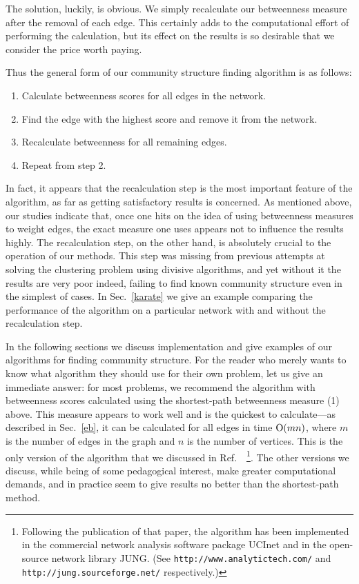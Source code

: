 \documentclass[twocolumn,pre,superscriptaddress]{revtex4}
\begin{document}
The solution, luckily, is obvious.  We simply recalculate our betweenness
measure after the removal of each edge.  This certainly adds to the
computational effort of performing the calculation, but its effect on the
results is so desirable that we consider the price worth paying.

Thus the general form of our community structure finding algorithm is as
follows:
\begin{enumerate}
\item Calculate betweenness scores for all edges in the network.
\item Find the edge with the highest score and remove it from the network.
\item Recalculate betweenness for all remaining edges.
\item Repeat from step 2.
\end{enumerate}

In fact, it appears that the recalculation step is the most important
feature of the algorithm, as far as getting satisfactory results is
concerned.  As mentioned above, our studies indicate that, once one hits on
the idea of using betweenness measures to weight edges, the exact measure
one uses appears not to influence the results highly.  The recalculation
step, on the other hand, is absolutely crucial to the operation of our
methods.  This step was missing from previous attempts at solving the
clustering problem using divisive algorithms, and yet without it the
results are very poor indeed, failing to find known community structure
even in the simplest of cases.  In Sec.~\ref{karate} we give an example
comparing the performance of the algorithm on a particular network with and
without the recalculation step.

In the following sections we discuss implementation and give examples of
our algorithms for finding community structure.  For the reader who merely
wants to know what algorithm they should use for their own problem, let us
give an immediate answer: for most problems, we recommend the algorithm
with betweenness scores calculated using the shortest-path betweenness
measure (1) above.  This measure appears to work well and is the quickest
to calculate---as described in Sec.~\ref{eb}, it can be calculated for all
edges in time $\mathrm{O}(mn)$, where $m$ is the number of edges in the graph and
$n$ is the number of vertices.  This is the only version of the algorithm
that we discussed in Ref.~~\footnote{Following the
publication of that paper, the algorithm has been implemented in the
commercial network analysis software package UCInet and in the open-source
network library JUNG.  (See \texttt{http://www.analytictech.com/} and
\texttt{http://jung.sourceforge.net/} respectively.)}.  The other versions
we discuss, while being of some pedagogical interest, make greater
computational demands, and in practice seem to give results no better than
the shortest-path method.
\end{document}
